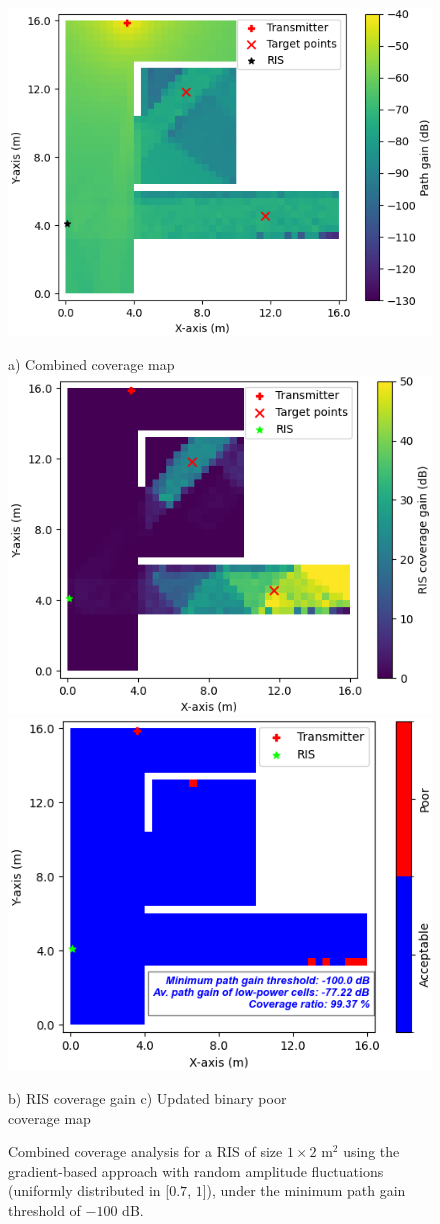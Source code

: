 \documentclass{IEEEoj}
\begin{document}
\begin{figure}
	\centering
	\includegraphics[width=0.8\linewidth]{Sim_Results/amp_change_Comb_cov_1x2_Gradient.png}
	
	a) Combined coverage map \\[5pt]
	
	\includegraphics[width=0.49\linewidth]{Sim_Results/amp_change_RIS_cov_gain_1x2_Gradient.png}
	\hfill
	\includegraphics[width=0.48\linewidth]{Sim_Results/amp_change_New_Binary_Cov_Map_1x2_Gradient.png}
	
	\hspace{10pt} b) RIS coverage gain \hspace{30pt} c) Updated binary poor \\ \hspace{140pt} coverage map
	\caption{Combined coverage analysis for a RIS of size $1 \times 2$ m$^2$ using the gradient-based approach with random amplitude fluctuations (uniformly distributed in [$0.7$, $1$]), under the minimum path gain threshold of $-100$ dB.}
	\label{amp_change_comb_cov_gradient}
\end{figure}
\end{document}
